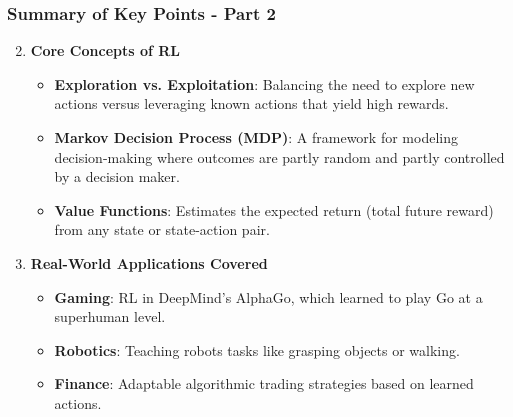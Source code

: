 \documentclass{beamer}
\begin{document}
\begin{frame}[fragile]
    \frametitle{Summary of Key Points - Part 2}
    \begin{enumerate}
        \setcounter{enumi}{1}
        \item \textbf{Core Concepts of RL}
        \begin{itemize}
            \item \textbf{Exploration vs. Exploitation}: Balancing the need to explore new actions versus leveraging known actions that yield high rewards.
            \item \textbf{Markov Decision Process (MDP)}: A framework for modeling decision-making where outcomes are partly random and partly controlled by a decision maker.
            \item \textbf{Value Functions}: Estimates the expected return (total future reward) from any state or state-action pair.
        \end{itemize}

        \item \textbf{Real-World Applications Covered}
        \begin{itemize}
            \item \textbf{Gaming}: RL in DeepMind’s AlphaGo, which learned to play Go at a superhuman level.
            \item \textbf{Robotics}: Teaching robots tasks like grasping objects or walking.
            \item \textbf{Finance}: Adaptable algorithmic trading strategies based on learned actions.
        \end{itemize}
    \end{enumerate}
\end{frame}
\end{document}
